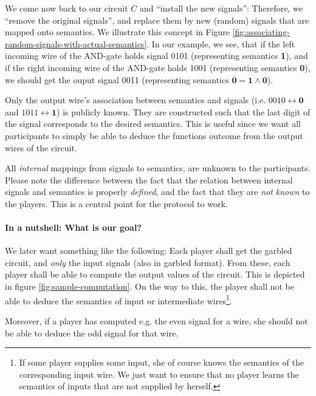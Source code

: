 \message{ !name(seminar.tex)}\documentclass{llncs}
\begin{document}
We come now back to our circuit $C$ and ``install the new signals'': Therefore, we ``remove the original signals'', and replace them by new (random) signals that are mapped onto semantics. We illustrate this concept in Figure \ref{fig:associating-random-signals-with-actual-semantics}. In our example, we see, that if the left incoming wire of the AND-gate holds signal 0101 (representing semantics \textbf{1}), and if the right incoming wire of the AND-gate holds 1001 (representing semantics \textbf{0}), we should get the ouput signal 0011 (representing semantics $\mathbf{0}=\mathbf{1}\wedge \mathbf{0}$).

Only the output wire's association between semantics and signals (i.e. $0010\leftrightarrow \mathbf{0}$ and $1011\leftrightarrow \mathbf{1}$) is publicly known. They are constructed such that the last digit of the signal corresponds to the desired semantics. This is useful since we want all participants to simply be able to deduce the functions outcome from the output wires of the circuit.

All \emph{internal} mappings from signals to semantics, are unknown to the participants. Please note the difference between the fact that the relation between internal signals and semantics is properly \emph{defined}, and the fact that they are \emph{not known} to the players. This is a central point for the protocol to work.

\paragraph{In a nutshell: What is our goal?}

We later want something like the following: Each player shall get the garbled circuit, and \emph{only} the input signals (also in garbled format). From these, each player shall be able to compute the output values of the circuit. This is depicted in figure \ref{fig:sample-computation}. On the way to this, the player shall not be able to deduce the semantics of input or intermediate wires\footnote{If some player supplies some input, she of course knows the semantics of the corresponding input wire. We just want to ensure that no player learns the semantics of inputs that are not supplied by herself.}.

Moreover, if a player has computed e.g. the even signal for a wire, she should not be able to deduce the odd signal for that wire.
\end{document}

